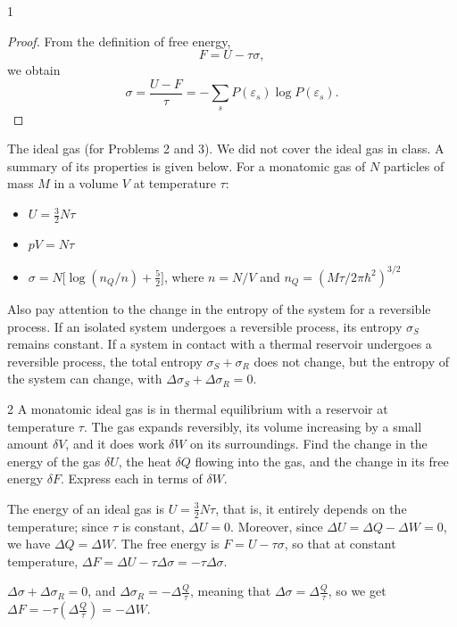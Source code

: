 \documentclass[11pt]{article}
\begin{document}
\begin{problem}{1}
\begin{enumerate}[label=(\alph*)]
\begin{proof}
    From the definition of free energy,
    \begin{equation}
        \label{eq:p1-helmholtz}
        F=U-\tau\sigma,
    \end{equation}
    we obtain
    \begin{equation}
        \label{eq:p1-gibbs-entropy-result}
        \boxed{
            \sigma=\frac{U-F}{\tau}
            =-\sum_s P(\varepsilon_s)\log P(\varepsilon_s)
        }.
    \end{equation}
        \end{proof}
\end{enumerate}
\end{problem}

The ideal gas (for Problems 2 and 3).
We did not cover the ideal gas in class.
A summary of its properties is given below.
For a monatomic gas of \( N \) particles of mass \( M \) in a volume \( V \) at temperature \( \tau \):
\begin{itemize}
  \item \( U = \frac{3}{2}N\tau \)
  \item \( pV = N\tau \)
  \item \( \sigma = N\bigl[\log(n_Q/n) + \frac{5}{2}\bigr] \), where \( n = N/V \) and \( n_Q = (M\tau/2\pi\hbar^2)^{3/2} \)
\end{itemize}
Also pay attention to the change in the entropy of the system for a reversible process.
If an isolated system undergoes a reversible process, its entropy \( \sigma_S \) remains constant.
If a system in contact with a thermal reservoir undergoes a reversible process, the total entropy \( \sigma_S + \sigma_R \) does not change, but the entropy of the system can change, with \( \Delta\sigma_S + \Delta\sigma_R = 0 \).

\begin{problem}{2}
A monatomic ideal gas is in thermal equilibrium with a reservoir at temperature \( \tau \).
The gas expands reversibly, its volume increasing by a small amount \( \delta V \), and it does work \( \delta W \) on its surroundings.
Find the change in the energy of the gas \( \delta U \), the heat \( \delta Q \) flowing into the gas, and the change in its free energy \( \delta F \).
Express each in terms of \( \delta W \).
\end{problem}
\begin{answer}
  The energy of an ideal gas is \( U = \frac{3}{2}N\tau \), that is, it entirely depends on the temperature; since \(\tau\) is constant, \(\Delta U = 0\).
  Moreover, since \( \Delta U = \Delta Q - \Delta W = 0 \), we have \(\Delta Q = \Delta W\).
  The free energy is \( F = U - \tau\sigma \), so that at constant temperature, \( \Delta F = \Delta U - \tau \Delta \sigma = -\tau \Delta \sigma\).

  \(\Delta \sigma + \Delta \sigma_R = 0\), and \(\Delta \sigma_R = -\Delta \frac{Q}{\tau} \), meaning that \( \Delta \sigma = \Delta \frac{Q}{\tau} \), so we get \(\Delta F = -\tau(\Delta \frac{Q}{\tau}) = -\Delta W\).
\end{answer}
\end{document}
